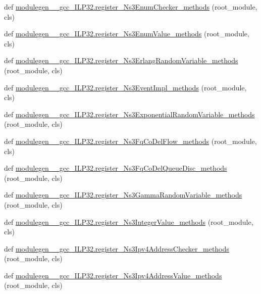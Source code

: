 \begin{DoxyCompactItemize}
def \hyperlink{namespacemodulegen____gcc__ILP32_ae5912f10b50cb9b22868a90b1a8af6ff}{modulegen\+\_\+\+\_\+gcc\+\_\+\+I\+L\+P32.\+register\+\_\+\+Ns3\+Enum\+Checker\+\_\+methods} (root\+\_\+module, cls)
\item 
def \hyperlink{namespacemodulegen____gcc__ILP32_ae326f463de72e46c155fc6b4d513b935}{modulegen\+\_\+\+\_\+gcc\+\_\+\+I\+L\+P32.\+register\+\_\+\+Ns3\+Enum\+Value\+\_\+methods} (root\+\_\+module, cls)
\item 
def \hyperlink{namespacemodulegen____gcc__ILP32_a303a1d3c5897c3befc105fd1ae0555a3}{modulegen\+\_\+\+\_\+gcc\+\_\+\+I\+L\+P32.\+register\+\_\+\+Ns3\+Erlang\+Random\+Variable\+\_\+methods} (root\+\_\+module, cls)
\item 
def \hyperlink{namespacemodulegen____gcc__ILP32_a600366111aadb7115136bfec5f8675e7}{modulegen\+\_\+\+\_\+gcc\+\_\+\+I\+L\+P32.\+register\+\_\+\+Ns3\+Event\+Impl\+\_\+methods} (root\+\_\+module, cls)
\item 
def \hyperlink{namespacemodulegen____gcc__ILP32_aece736044889d144f4bee4d03b7de81b}{modulegen\+\_\+\+\_\+gcc\+\_\+\+I\+L\+P32.\+register\+\_\+\+Ns3\+Exponential\+Random\+Variable\+\_\+methods} (root\+\_\+module, cls)
\item 
def \hyperlink{namespacemodulegen____gcc__ILP32_a615358ae6950c1ee8d06bff421bee33c}{modulegen\+\_\+\+\_\+gcc\+\_\+\+I\+L\+P32.\+register\+\_\+\+Ns3\+Fq\+Co\+Del\+Flow\+\_\+methods} (root\+\_\+module, cls)
\item 
def \hyperlink{namespacemodulegen____gcc__ILP32_a58fad044157bb9bb447973929b35c262}{modulegen\+\_\+\+\_\+gcc\+\_\+\+I\+L\+P32.\+register\+\_\+\+Ns3\+Fq\+Co\+Del\+Queue\+Disc\+\_\+methods} (root\+\_\+module, cls)
\item 
def \hyperlink{namespacemodulegen____gcc__ILP32_a12228d101ebfb3792bcdf5f3d4749309}{modulegen\+\_\+\+\_\+gcc\+\_\+\+I\+L\+P32.\+register\+\_\+\+Ns3\+Gamma\+Random\+Variable\+\_\+methods} (root\+\_\+module, cls)
\item 
def \hyperlink{namespacemodulegen____gcc__ILP32_a4b61c0b25893bff5747f1c50aeb73acb}{modulegen\+\_\+\+\_\+gcc\+\_\+\+I\+L\+P32.\+register\+\_\+\+Ns3\+Integer\+Value\+\_\+methods} (root\+\_\+module, cls)
\item 
def \hyperlink{namespacemodulegen____gcc__ILP32_a91bc88170d5111bf6c9c0defc82f9018}{modulegen\+\_\+\+\_\+gcc\+\_\+\+I\+L\+P32.\+register\+\_\+\+Ns3\+Ipv4\+Address\+Checker\+\_\+methods} (root\+\_\+module, cls)
\item 
def \hyperlink{namespacemodulegen____gcc__ILP32_a9b966337400674f232afe6830aa55a11}{modulegen\+\_\+\+\_\+gcc\+\_\+\+I\+L\+P32.\+register\+\_\+\+Ns3\+Ipv4\+Address\+Value\+\_\+methods} (root\+\_\+module, cls)

\end{DoxyCompactItemize}
